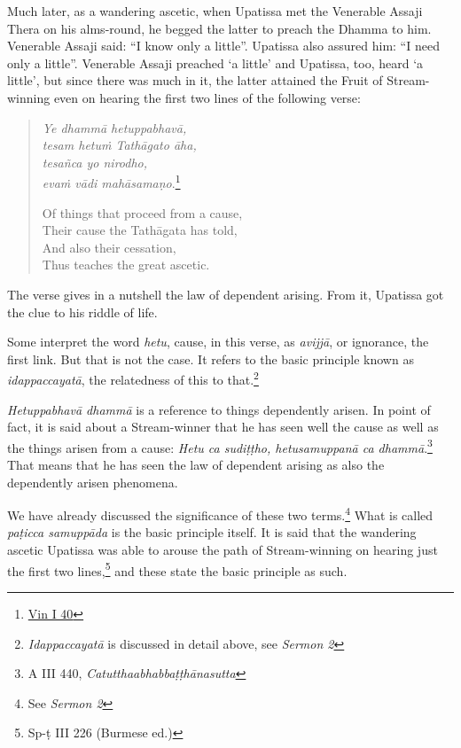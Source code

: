 Much later, as a wandering ascetic, when Upatissa met the Venerable Assaji Thera on his alms-round, he begged the latter to preach the Dhamma to him. Venerable Assaji said: ``I know only a little''. Upatissa also assured him: ``I need only a little''. Venerable Assaji preached `a little' and Upatissa, too, heard `a little', but since there was much in it, the latter attained the Fruit of Stream-winning even on hearing the first two lines of the following verse:

\clearpage

\begin{quote}
\emph{Ye dhammā hetuppabhavā,}\\
\emph{tesam hetuṁ Tathāgato āha,}\\
\emph{tesañca yo nirodho,}\\
\emph{evaṁ vādi mahāsamaṇo}.\footnote{\href{https://suttacentral.net/pli-tv-kd1/pli/ms}{Vin I 40}}

Of things that proceed from a cause,\\
Their cause the Tathāgata has told,\\
And also their cessation,\\
Thus teaches the great ascetic.
\end{quote}

The verse gives in a nutshell the law of dependent arising. From it, Upatissa got the clue to his riddle of life.

Some interpret the word \emph{hetu}, cause, in this verse, as \emph{avijjā}, or ignorance, the first link. But that is not the case. It refers to the basic principle known as \emph{idappaccayatā}, the relatedness of this to that.\footnote{\emph{Idappaccayatā} is discussed in detail above, see \emph{Sermon 2}}

\emph{Hetuppabhavā dhammā} is a reference to things dependently arisen. In point of fact, it is said about a Stream-winner that he has seen well the cause as well as the things arisen from a cause: \emph{Hetu ca sudiṭṭho, hetusamuppanā ca dhammā}.\footnote{A III 440, \emph{Catutthaabhabbaṭṭhānasutta}} That means that he has seen the law of dependent arising as also the dependently arisen phenomena.

We have already discussed the significance of these two terms.\footnote{See \emph{Sermon 2}} What is called \emph{paṭicca samuppāda} is the basic principle itself. It is said that the wandering ascetic Upatissa was able to arouse the path of Stream-winning on hearing just the first two lines,\footnote{Sp-ṭ III 226 (Burmese ed.)} and these state the basic principle as such.

